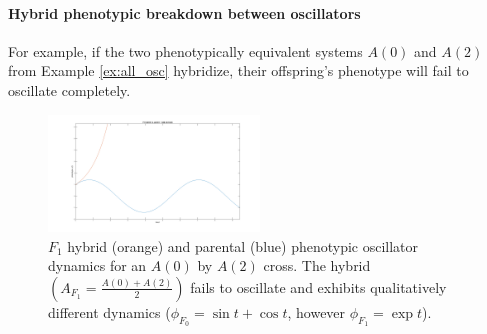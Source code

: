 \documentclass{article}
\newcommand{\1}{\mathbbm{1}}
\begin{document}
\paragraph*{Hybrid phenotypic breakdown between oscillators}
For example, if the two phenotypically equivalent systems $A(0)$ and $A(2)$ from Example \ref{ex:all_osc} hybridize, their offspring's phenotype will fail to oscillate completely. 
  \begin{figure}[H]
    \centering
    \includegraphics[width=0.5\textwidth, height=0.125\paperheight]{expF1}
    \caption{$F_1$ hybrid (orange) and parental (blue) phenotypic oscillator dynamics for an $A(0)$ by $A(2)$ cross. The hybrid $\left(A_{F_1}\!\!=\!\!\tfrac{A\!(\!0\!) \! + \! A\!(\!2\!)}{2}\right)$ fails to oscillate and exhibits qualitatively different dynamics ($\phi_{F_0}\! = \! \sin t \! + \! \cos t$, however $\phi_{F_1} \! = \! \exp t$).
    }
  \end{figure}
%
%
%
\end{document}
